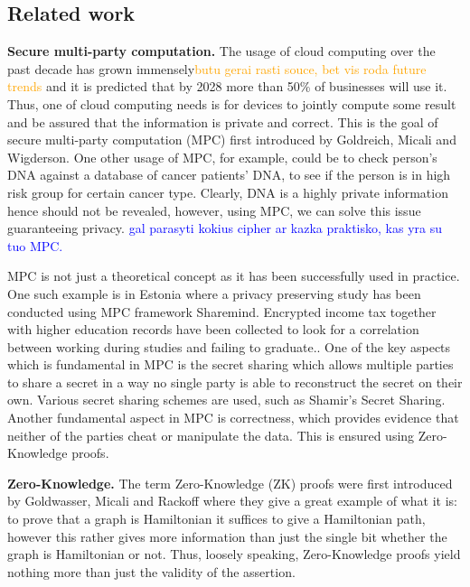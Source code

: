 \documentclass{Resources/UoBLab1}
\theoremstyle{definition}
\begin{document}
\subsection{Related work}
\textbf{Secure multi-party computation.} The usage of cloud computing over the past decade has grown immensely\textcolor{orange}{butu gerai rasti souce, bet vis roda future trends} and it is predicted that by 2028 more than 50\% of businesses will use it\cite{CloudTrend}. Thus, one of cloud computing needs is for devices to jointly compute some result and be assured that the information is private and correct. This is the goal of secure multi-party computation (MPC) first introduced by Goldreich, Micali and Wigderson\cite{MPCFirst}. One other usage of MPC, for example, could be to check person's DNA against a database of cancer patients' DNA, to see if the person is in high risk group for certain cancer type. Clearly, DNA is a highly private information hence should not be revealed, however, using MPC, we can solve this issue guaranteeing privacy.
\textcolor{blue}{gal parasyti kokius cipher ar kazka praktisko, kas yra su tuo MPC.}

MPC is not just a theoretical concept as it has been successfully used in practice. One such example is in Estonia where a privacy preserving study has been conducted using MPC framework Sharemind\cite{Sharemind}. Encrypted income tax together with higher education records have been collected to look for a correlation between working during studies and failing to graduate.\cite{Estija}. One of the key aspects which is fundamental in MPC is the secret sharing which allows multiple parties to share a secret in a way no single party is able to reconstruct the secret on their own. Various secret sharing schemes are used, such as Shamir's Secret Sharing\cite{Shamir}. Another fundamental aspect in MPC is correctness, which provides evidence that neither of the parties cheat or manipulate the data. This is ensured using Zero-Knowledge proofs.\medskip

\noindent\textbf{Zero-Knowledge.} The term Zero-Knowledge (ZK) proofs were first introduced by Goldwasser, Micali and Rackoff\cite{ZKOrigin} where they give a great example of what it is: to prove that a graph is Hamiltonian it suffices to give a Hamiltonian path, however this rather gives more information than just the single bit whether the graph is Hamiltonian or not. Thus, loosely speaking, Zero-Knowledge proofs yield nothing more than just the validity of the assertion.
\end{document}
